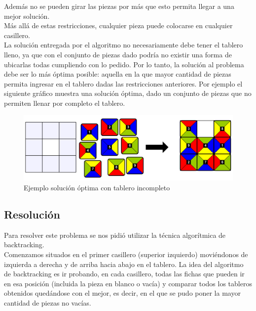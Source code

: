 Adem\'as no se pueden girar las piezas por más que esto permita llegar a una mejor soluci\'on.\\
M\'as all\'a de estas restricciones, cualquier pieza puede colocarse en cualquier casillero.\\
La soluci\'on entregada por el algoritmo no necesariamente debe tener el tablero lleno, ya que con el conjunto de piezas dado podr\'ia no existir una forma de ubicarlas todas cumpliendo con lo pedido. Por lo tanto, la soluci\'on al problema debe ser lo m\'as \'optima posible: aquella en la que mayor cantidad de piezas permita ingresar en el tablero dadas las restricciones anteriores.
Por ejemplo el siguiente gr\'afico muestra una soluci\'on \'optima, dado un conjunto de piezas que no permiten llenar por completo el tablero.\\

\begin{figure}[h]
\begin{center}
\includegraphics[scale=0.4]{./img/tableroIncompleto.png}
\caption{Ejemplo soluci\'on \'optima con tablero incompleto}
\end{center}
\end{figure}

\subsection{Resoluci\'on}

Para resolver este problema se nos pidi\'o utilizar la t\'ecnica algor\'itmica de backtracking.\\ 
Comenzamos situados en el primer casillero (superior izquierdo) movi\'endonos de izquierda a derecha y de arriba hacia abajo en el tablero. La idea del algoritmo de backtracking es ir probando, en cada casillero, todas las fichas que pueden ir en esa posici\'on (incluida la pieza en blanco o vac\'ia) y comparar todos los tableros obtenidos qued\'andose con el mejor, es decir, en el que se pudo poner la mayor cantidad de piezas no vac\'ias. \\


